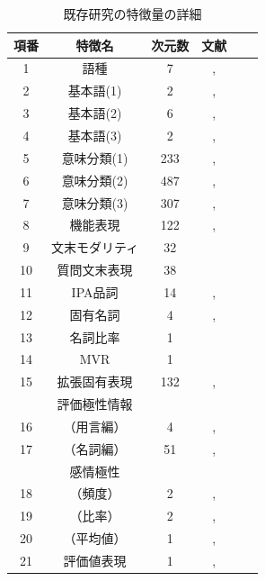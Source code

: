 \documentclass[12pt,a4paper,twocolumn,twoside]{jsik}
\begin{document}
\renewcommand\thefootnote{\fnsymbol{footnote}}
\begin{table}[htb]
  \caption{既存研究の特徴量の詳細}
  \label{tab:sentiment_tag}
  \begin{center}
  \begin{tabular}{|c|c|c|c|c|c|} \hline
    項番 & 特徴名 & 次元数 & 文献 \\ \hline \hline
    1 & 語種 & 7 &\footnotemark[2],\cite{moji_word_type_3} \\ \hline
    2 & 基本語(1) & 2 & \footnotemark[2],\cite{basic_vocabulary} \\ \hline
    3 & 基本語(2) & 6 & \footnotemark[2],\cite{basic_vocabulary} \\ \hline
    4 & 基本語(3) & 2 & \footnotemark[2],\cite{basic_vocabulary} \\ \hline
    5 & 意味分類(1)  & 233 &\footnotemark[2],\cite{semantic_attributes} \\ \hline
    6 & 意味分類(2)  & 487 &\footnotemark[2],\cite{semantic_attributes} \\ \hline
    7 & 意味分類(3)  & 307 &\footnotemark[2],\cite{semantic_attributes} \\ \hline
    8 & 機能表現  & 122 &\footnotemark[3],\cite{factuality_annotation} \\ \hline
    9 & 文末モダリティ  & 32 &\cite{modality} \\ \hline
    10 & 質問文末表現  & 38 &\cite{qa_feature} \\ \hline
    11 & IPA品詞  & 14 &\footnotemark[4],\cite{applied_proper_noun} \\ \hline
    12 & 固有名詞 & 4 &\footnotemark[4],\cite{applied_proper_noun} \\ \hline
    13 & 名詞比率  & 1 &\cite{applied_part_of_speech} \\ \hline
    14 & MVR  & 1 &\cite{applied_part_of_speech} \\ \hline
    15 & 拡張固有表現 & 132 &\footnotemark[5],\cite{extended_namedentity} \\ \hline
     & 評価極性情報 &  &\\ 
    16 & （用言編）  & 4 &\footnotemark[3],\cite{sentiment_verbs} \\ 
    17 & （名詞編）  & 51 &\footnotemark[3],\cite{sentiment_nouns} \\ \hline
     & 感情極性 &  & \cite{sentiment_spin} \\ 
    18 & （頻度）  & 2 & \footnotemark[6],\cite{sentiment_spin,sentiment_survey} \\ 
    19 & （比率）  & 2 & \footnotemark[6],\cite{sentiment_spin,sentiment_survey} \\ 
    20 & （平均値）  & 1 & \footnotemark[6],\cite{sentiment_spin,sentiment_survey} \\ \hline
    21 & 評価値表現 & 1 & \footnotemark[7],\cite{sentiment_fe} \\ \hline
  \end{tabular}
  \end{center}
\end{table}
\end{document}
